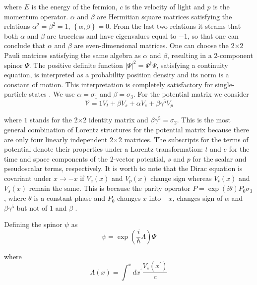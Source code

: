 \documentclass[a4paper,12pt,titlepage]{article}
\begin{document}
\noindent where $E$ is the energy of the fermion, $c$ is the velocity of
light and $p$ is the momentum operator. $\alpha $ and $\beta $ are Hermitian
square matrices satisfying the relations $\alpha ^{2}=\beta ^{2}=1$, $%
\left\{ \alpha ,\beta \right\} =0$. From the last two relations it steams
that both $\alpha $ and $\beta $ are traceless and have eigenvalues equal to 
$-$1, so that one can conclude that $\alpha $ and $\beta $ are
even-dimensional matrices. One can choose the 2$\times $2 Pauli matrices
satisfying the same algebra as $\alpha $ and $\beta $, resulting in a
2-component spinor $\Psi $. The positive definite function $|\Psi |^{2}=\Psi
^{\dagger }\Psi $, satisfying a continuity equation, is interpreted as a
probability position density and its norm is a constant of motion. This
interpretation is completely satisfactory for single-particle states \cite
{tha}. We use $\alpha =\sigma _{1}$ and $\beta =\sigma _{3}$. For the
potential matrix we consider 
\begin{equation}
\mathcal{V}=1V_{t}+\beta V_{s}+\alpha V_{e}+\beta \gamma ^{5}V_{p}
\label{eq2}
\end{equation}

\noindent where $1$ stands for the 2$\times $2 identity matrix and $\beta
\gamma ^{5}=\sigma _{2}$. This is the most general combination of Lorentz
structures for the potential matrix because there are only four linearly
independent 2$\times $2 matrices. The subscripts for the terms of potential
denote their properties under a Lorentz transformation: $t$ and $e$ for the
time and space components of the 2-vector potential, $s$ and $p$ for the
scalar and pseudoscalar terms, respectively. It is worth to note that the
Dirac equation is covariant under $x\rightarrow -x$ if $V_{e}(x)$ and $%
V_{p}(x)$ change sign whereas $V_{t}(x)$ and $V_{s}(x)$ remain the same.
This is because the parity operator $P=\exp (i\theta )P_{0}\sigma _{3}$,
where $\theta $ is a constant phase and $P_{0}$ changes $x$ into $-x$,
changes sign of $\alpha $ and $\beta \gamma ^{5}$ but not of $1$ and $\beta $%
.

Defining the spinor $\psi $ as 
\begin{equation}
\psi =\exp \left( \frac{i}{\hbar }\Lambda \right) \Psi  \label{eq5}
\end{equation}

\noindent where 
\begin{equation}
\Lambda (x)=\int^{x}dx^{\prime }\frac{V_{e}(x^{\prime })}{c}  \label{eq6}
\end{equation}
\end{document}

